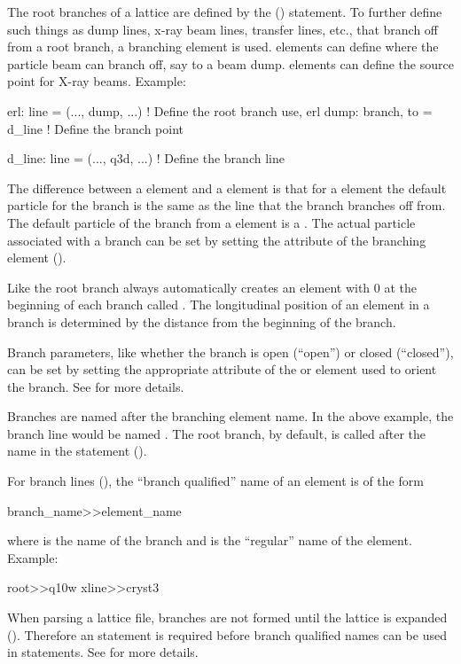 The root branches of a lattice are defined by the 
() statement. To further define such things as dump lines,
x-ray beam lines, transfer lines, etc., that branch off from a root
branch, a branching element is used.   elements can define
where the particle beam can branch off, say to a beam
dump.  elements can define the source point for
X-ray beams.  Example:
\begin{example}
  erl: line = (..., dump, ...)               ! Define the root branch 
  use, erl
  dump: branch, to = d_line                  ! Define the branch point

  d_line: line = (..., q3d, ...)             ! Define the branch line
\end{example}
The difference between a  element and a 
element is that for a  element the default particle for the
branch is the same as the line that the branch branches off from. The
default particle of the branch from a  element is a
. The actual particle associated with a branch can be set
by setting the  attribute of the branching element
().

Like the root branch \bmad always automatically creates an element
with  0 at the beginning of each branch called
. The longitudinal  position of an element in a
branch is determined by the distance from the beginning of the branch.

Branch parameters, like whether the branch is open
(``open'') or closed (``closed''), can be set
by setting the appropriate attribute of the  or
 element used to orient the branch.
See  for more details.

Branches are named after the branching element name. In the above
example, the branch line would be named . The root branch, by
default, is called after the name in the  statement
().

For branch lines (), the ``branch
qualified'' name of an element is of the form
\begin{example}
  branch_name>>element_name
\end{example}
where  is the name of the branch and  is the
``regular'' name of the element. Example:
\begin{example}
  root>>q10w
  xline>>cryst3
\end{example}
When parsing a lattice file, branches are not formed until the lattice
is expanded (). Therefore an 
statement is required before branch qualified names can be used in
statements.  See  for more details.

